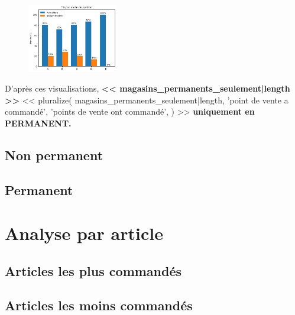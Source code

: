\documentclass{beamer}
\begin{document}
\begin{frame}
        \begin{figure}[h]
            \centering
            \includegraphics[height=3cm]{assets/ca_magasins_par_mode_de_gestion}
        \end{figure}

        D’après ces visualisations, \textbf{<< magasins_permanents_seulement|length >>}
        << pluralize(
            magasins_permanents_seulement|length,
            'point de vente a commandé',
            'points de vente ont commandé',
        ) >>
        \textbf{uniquement en PERMANENT.}
    \end{frame}

    \subsection{Non permanent}

    \begin{frame}
    \end{frame}

    \subsection{Permanent}

    \begin{frame}
    \end{frame}

    \section{Analyse par article}
    \subsection{Articles les plus commandés}

    \begin{frame}
    \end{frame}

    \subsection{Articles les moins commandés}

    \begin{frame}
    \end{frame}
\end{document}
